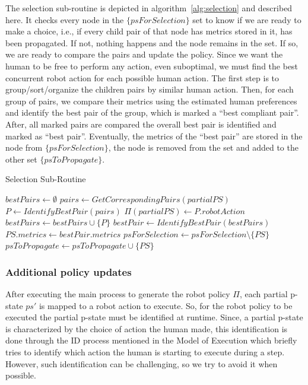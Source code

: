 The selection sub-routine is depicted in algorithm~\ref{alg:selection} and described here. It checks every node in the $\{psForSelection\}$ set to know if we are ready to make a choice, i.e., if every child pair of that node has metrics stored in it, has been propagated. 
If not, nothing happens and the node remains in the set.
If so, we are ready to compare the pairs and update the policy. Since we want the human to be free to perform any action, even suboptimal, we must find the best concurrent robot action for each possible human action. The first step is to group/sort/organize the children pairs by similar human action. Then, for each group of pairs, we compare their metrics using the estimated human preferences and identify the best pair of the group, which is marked a ``best compliant pair''. After, all marked pairs are compared the overall best pair is identified and marked as ``best pair''. Eventually, the metrics of the ``best pair'' are stored in the node from $\{psForSelection\}$, the node is removed from the set and added to the other set $\{psToPropagate\}$.

\begin{algorithm}
\caption{Selection Sub-Routine}\label{alg:selection}
\begin{algorithmic}[1]

        \State $bestPairs \gets \emptyset$
            \State $pairs \gets GetCorrespondingPairs(partialPS)$
            \State $P \gets IdentifyBestPair(pairs)$ 
            \State $\Pi(partialPS) \gets P.robotAction$
            \State $bestPairs \gets bestPairs \cup \{P\}$
        \EndFor
        \State 
        \State $bestPair \gets IdentifyBestPair(bestPairs)$
        \State 
        \State $PS.metrics \gets bestPair.metrics$
        \State $psForSelection \gets psForSelection \setminus \{PS\}$
        \State $psToPropagate \gets psToPropagate \cup \{PS\}$
    \EndIf
\EndFor

\end{algorithmic}
\end{algorithm}

    \subsubsection{Additional policy updates}

After executing the main process to generate the robot policy $\Pi$, each partial p-state $ps'$ is mapped to a robot action to execute. So, for the robot policy to be executed the partial p-state must be identified at runtime. 
Since, a partial p-state is characterized by the choice of action the human made, this identification is done through the ID process mentioned in the Model of Execution which briefly tries to identify which action the human is starting to execute during a step. However, such identification can be challenging, so we try to avoid it when possible. 

